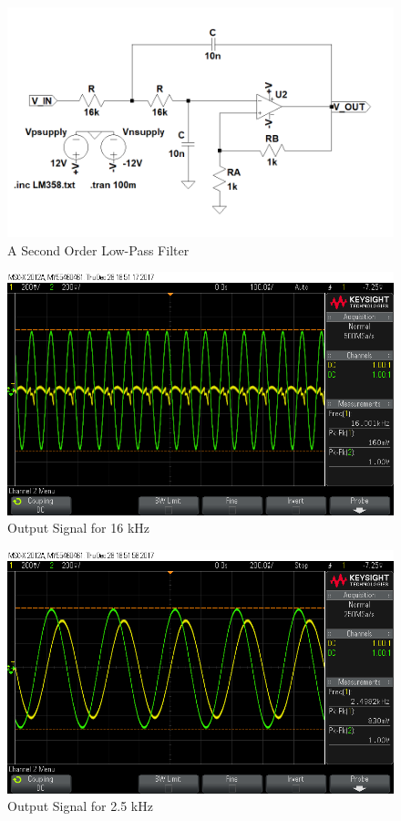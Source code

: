 \documentclass[paper]{IEEEtran}
\begin{document}
\begin{figure}[h!]
	\setlength{\unitlength}{\textwidth}
	\center 
	\includegraphics[width=0.5\unitlength]{lpfv2.png}
	\caption{\label{fig:lpf}A Second Order Low-Pass Filter }
\end{figure} 
	


\begin{figure}[h!]
	\setlength{\unitlength}{\textwidth}
	\center 
	\includegraphics[width=0.45\unitlength]{filt_osc2.png}
	\caption{\label{fig:lpfvo1}Output Signal for 16 kHz}
\end{figure} 
	

\begin{figure}[h!]
	\setlength{\unitlength}{\textwidth}
	\center 
	\includegraphics[width=0.45\unitlength]{filt_osc4.png}
	\caption{\label{fig:lpfvo2}Output Signal for 2.5 kHz}
\end{figure} 
	
\end{document}
